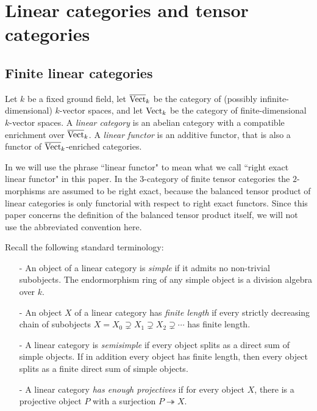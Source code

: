 \documentclass{amsart}
\begin{document}
\section{Linear categories and tensor categories} \label{sec:tc-lincat}

\subsection{Finite linear categories}

	Let $k$ be a fixed ground field, let $\overline{\mathrm{Vect}}_k$ be the category of (possibly infinite-dimensional) $k$-vector spaces, and let $\mathrm{Vect}_k$ be the category of finite-dimensional $k$-vector spaces.   A {\em linear category} is an abelian category with a compatible enrichment over $\overline{\mathrm{Vect}}_k$. 
A {\em linear functor} is an additive functor, that is also a functor of $\overline{\mathrm{Vect}}_k$-enriched categories. 

\begin{warning}
	In \cite{3TC, DTCI} we will use the phrase ``linear functor" to mean what we call ``right exact linear functor" in this paper.  In the $3$-category of finite tensor categories the $2$-morphisms are assumed to be right exact, because the balanced tensor product of linear categories is only functorial with respect to right exact functors.  Since this paper concerns the definition of the balanced tensor product itself, we will not use the abbreviated convention here.
\end{warning}

Recall the following standard terminology:
\begin{itemize}
	\item[-] An object of a linear category is {\em simple} if it admits no non-trivial subobjects. The endormorphism ring of any simple object is a division algebra over $k$. 
	\item[-] An object $X$ of a linear category has {\em finite length} if every strictly decreasing chain of subobjects $X = X_0 \supsetneq X_1 \supsetneq X_2 \supsetneq  \cdots$ has finite length. 
	\item[-] A linear category is {\em semisimple} if every object splits as a direct sum of simple objects. If in addition every object has finite length, then every object splits as a finite direct sum of simple objects.
	\item[-] A linear category {\em has enough projectives} if for every object $X$, there is a projective object $P$ with a surjection $P \twoheadrightarrow X$. 
\end{itemize}
\end{document}
